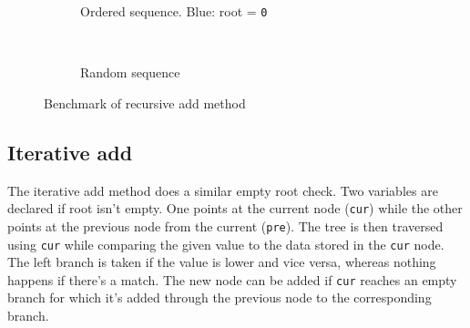 \documentclass[a4paper,11pt]{article}
\begin{document}
\begin{figure*}[ht!]
  \centering
  \begin{subfigure}[t]{0.47\textwidth}
    \caption{Ordered sequence. Blue: root = {\tt 0}}
    \label{fig:subplot1}
  \end{subfigure}
  ~
  \begin{subfigure}[t]{0.5\textwidth}
    \caption{Random sequence}
    \label{fig:subplot2}
  \end{subfigure}
  \caption{Benchmark of recursive add method}
  \label{fig:plot1}
\end{figure*}

\subsection*{Iterative add}

The iterative add method does a similar empty root check. Two variables 
are declared if root isn't empty. One points at the current node 
({\tt cur}) while the other points at the previous node from the
current ({\tt pre}). The tree is then traversed using {\tt cur} while
comparing the given value to the data stored in the {\tt cur} node. The 
left branch is taken if the value is lower and vice versa, whereas
nothing happens if there's a match. The new node can be added if
{\tt cur} reaches an empty branch for which it's added through the 
previous node to the corresponding branch.
\end{document}
